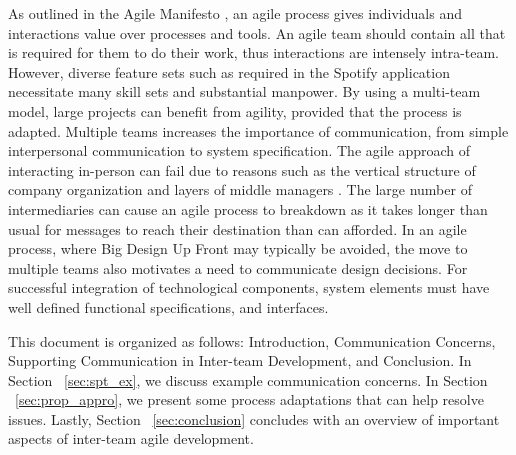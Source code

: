 As outlined in the Agile Manifesto \cite{beck2001agile}, an agile process gives individuals and interactions value over processes and tools.
An agile team should contain all that is required for them to do their work, thus interactions are intensely intra-team.
However, diverse feature sets such as required in the Spotify application necessitate many skill sets and substantial manpower.
By using a multi-team model, large projects can benefit from agility, provided that the process is adapted.
Multiple teams increases the importance of communication, from simple interpersonal communication to system specification. 
The agile approach of interacting in-person can fail due to reasons such as the vertical structure of company organization and layers of middle managers \cite{dzone_article}.
The large number of intermediaries can cause an agile process to breakdown as it takes longer than usual for messages to reach their destination than can afforded.
In an agile process, where Big Design Up Front may typically be avoided, the move to multiple teams also motivates a need to communicate design decisions.
For successful integration of technological components, system elements must have well defined functional specifications, and interfaces.


This document is organized as follows: Introduction, Communication Concerns, Supporting Communication in Inter-team Development, and Conclusion. 
In Section ~\ref{sec:spt_ex}, we discuss example communication concerns.
In Section ~\ref{sec:prop_appro}, we present some process adaptations that can help resolve issues.
Lastly, Section ~\ref{sec:conclusion} concludes with an overview of important aspects of inter-team agile development.


